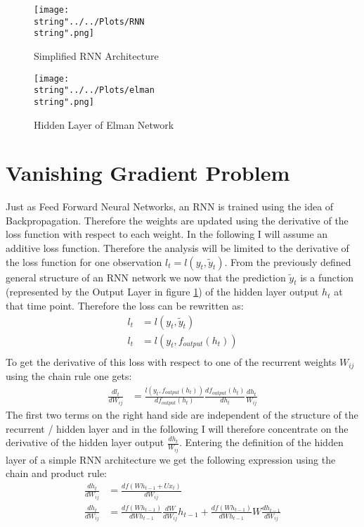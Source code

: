 \begin{figure}
  \centering
\texttt{[image: \\string"../../Plots/RNN\\string".png]}
  \caption{Simplified RNN Architecture}\label{fig:RNN}
\end{figure}

\begin{figure}
  \centering
\texttt{[image: \\string"../../Plots/elman\\string".png]}
  \caption{Hidden Layer of Elman Network}\label{fig:elman}
\end{figure}

\section{Vanishing Gradient Problem}
Just as Feed Forward Neural Networks, an RNN is trained using the idea of Backpropagation. Therefore the weights are updated using the derivative of the loss function with respect to each weight. In the following I will assume an additive loss function. Therefore the analysis will be limited to the derivative of the loss function for one observation $l_t = l(y_t, \tilde{y}_t)$. From the previously defined general structure of an RNN network we now that the prediction $\tilde{y}_t$ is a function (represented by the Output Layer in  figure \ref{fig:RNN}) of the hidden layer output $h_t$ at that time point. Therefore the loss can be rewritten as:
\begin{align*}
l_t &= l(y_t, \tilde{y}_t) \\
l_t &= l(y_t, f_{output}(h_t))\\
\end{align*}
To get the derivative of this loss with respect to one of the recurrent weights $W_{ij}$ using the chain rule one gets:
\begin{align*}
\frac{dl_t}{dW_{ij}} &= \frac{l(y_t, f_{output}(h_t))}{df_{output}(h_t)}\frac{df_{output}(h_t)}{dh_t}\frac{dh_t}{W_{ij}}
\end{align*}
The first two terms on the right hand side are independent of the structure of the recurrent / hidden layer and in the following I will therefore concentrate on the derivative of the hidden layer output $\frac{dh_t}{W_{ij}}$.
Entering the definition of the hidden layer of a simple RNN architecture we get the following expression using the chain and product rule:
\begin{align*}
\frac{dh_t}{dW_{ij}} &= \frac{df(Wh_{t-1} + Ux_t)}{dW_{ij}} \\
\frac{dh_t}{dW_{ij}} &= \frac{df(Wh_{t-1})}{dWh_{t-1}}\frac{dW}{dW_{ij}}h_{t-1} +\frac{df(Wh_{t-1})}{dWh_{t-1}} W\frac{dh_{t-1}}{dW_{ij}}
\end{align*}
